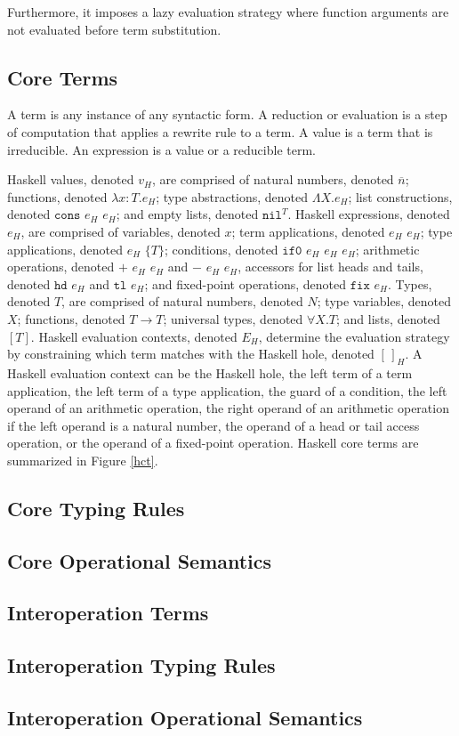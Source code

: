 Furthermore, it imposes a lazy evaluation strategy where function arguments are not evaluated before term substitution.

\subsection{Core Terms}

A term is any instance of any syntactic form.  A reduction or evaluation is a step of computation that applies a rewrite rule to a term.  A value is a term that is irreducible.  An expression is a value or a reducible term.

Haskell values, denoted $v_{H}$, are comprised of natural numbers, denoted $\overline{n}$; functions, denoted $\lambda x:T.e_{H}$; type abstractions, denoted $\Lambda X.e_{H}$; list constructions, denoted $\mathtt{cons}$ $e_{H}$ $e_{H}$; and empty lists, denoted $\mathtt{nil}^{T}$.  Haskell expressions, denoted $e_{H}$, are comprised of variables, denoted $x$; term applications, denoted $e_{H}$ $e_{H}$; type applications, denoted $e_{H}$ $\lbrace T\rbrace$; conditions, denoted $\mathtt{if0}$ $e_{H}$ $e_{H}$ $e_{H}$; arithmetic operations, denoted $+$ $e_{H}$ $e_{H}$ and $-$ $e_{H}$ $e_{H}$, accessors for list heads and tails, denoted $\mathtt{hd}$ $e_{H}$ and $\mathtt{tl}$ $e_{H}$; and fixed-point operations, denoted $\mathtt{fix}$ $e_{H}$.  Types, denoted $T$, are comprised of natural numbers, denoted $N$; type variables, denoted $X$; functions, denoted $T\rightarrow T$; universal types, denoted $\forall X.T$; and lists, denoted $[T]$.  Haskell evaluation contexts, denoted $E_{H}$, determine the evaluation strategy by constraining which term matches with the Haskell hole, denoted $[\,]_{H}$.  A Haskell evaluation context can be the Haskell hole, the left term of a term application, the left term of a type application, the guard of a condition, the left operand of an arithmetic operation, the right operand of an arithmetic operation if the left operand is a natural number, the operand of a head or tail access operation, or the operand of a fixed-point operation.  Haskell core terms are summarized in Figure \ref{hct}.



\subsection{Core Typing Rules}

\subsection{Core Operational Semantics}

\subsection{Interoperation Terms}

\subsection{Interoperation Typing Rules}

\subsection{Interoperation Operational Semantics}